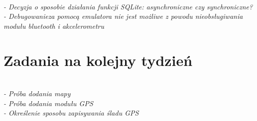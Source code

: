 \documentclass[12pt,a4paper]{mwart}
\begin{document}
\textit{\\
- Decyzja o sposobie działania funkcji SQLite: asynchroniczne czy synchroniczne?\\
- Debugowanieza pomocą emulatora nie jest możliwe z powodu nieobsługiwania modułu bluetooth i akcelerometru
} %

\section{Zadania na kolejny tydzień}
\textit{\\
- Próba dodania mapy\\
- Próba dodania modułu GPS\\
- Określenie sposobu zapisywania śladu GPS
} %
\end{document}
